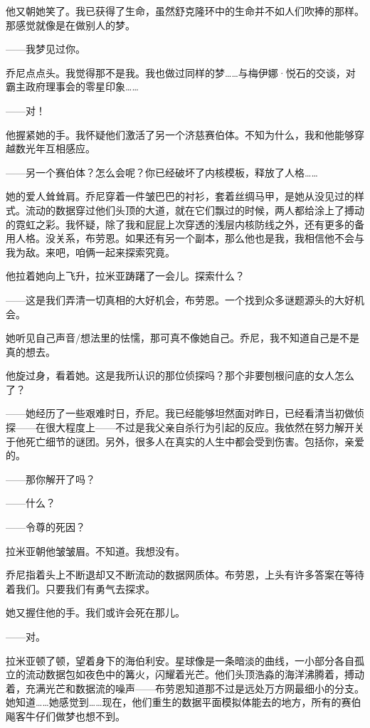 \documentclass[AutoFakeBold=true]{book}
\begin{document}
他又朝她笑了。{\kaishu 我已获得了生命，虽然舒克隆环中的生命并不如人们吹捧的那样。那感觉就像是在做别人的梦。}

{\kaishu ——我梦见过你。}

乔尼点点头。{\kaishu 我觉得那不是我。我也做过同样的梦……与梅伊娜·悦石的交谈，对霸主政府理事会的零星印象……}

{\kaishu ——对！}

他握紧她的手。{\kaishu 我怀疑他们激活了另一个济慈赛伯体。不知为什么，我和他能够穿越数光年互相感应。}

{\kaishu ——另一个赛伯体？怎么会呢？你已经破坏了内核模板，释放了人格……}

她的爱人耸耸肩。乔尼穿着一件皱巴巴的衬衫，套着丝绸马甲，是她从没见过的样式。流动的数据穿过他们头顶的大道，就在它们飘过的时候，两人都给涂上了搏动的霓虹之彩。{\kaishu 我怀疑，除了我和屁屁上次穿透的浅层内核防线之外，还有更多的备用人格。没关系，布劳恩。如果还有另一个副本，那么他也是我，我相信他不会与我为敌。来吧，咱俩一起来探索究竟。}

他拉着她向上飞升，拉米亚踌躇了一会儿。{\kaishu 探索什么？}

{\kaishu ——这是我们弄清一切真相的大好机会，布劳恩。一个找到众多谜题源头的大好机会。}

她听见自己声音/想法里的怯懦，那可真不像她自己。{\kaishu 乔尼，我不知道自己是不是真的想去。}

他旋过身，看着她。{\kaishu 这是我所认识的那位侦探吗？那个非要刨根问底的女人怎么了？}

{\kaishu ——她经历了一些艰难时日，乔尼。我已经能够坦然面对昨日，已经看清当初做侦探——在很大程度上——不过是我父亲自杀行为引起的反应。我依然在努力解开关于他死亡细节的谜团。另外，很多人在真实的人生中都会受到伤害。包括你，亲爱的。}

{\kaishu ——那你解开了吗？}

{\kaishu ——什么？}

{\kaishu ——令尊的死因？}

{\kaishu 拉米亚朝他皱皱眉。不知道。我想没有。}

乔尼指着头上不断退却又不断流动的数据网质体。{\kaishu 布劳恩，上头有许多答案在等待着我们。只要我们有勇气去探求。}

她又握住他的手。{\kaishu 我们或许会死在那儿。}

{\kaishu ——对。}

拉米亚顿了顿，望着身下的海伯利安。星球像是一条暗淡的曲线，一小部分各自孤立的流动数据包如夜色中的篝火，闪耀着光芒。他们头顶浩淼的海洋沸腾着，搏动着，充满光芒和数据流的噪声——布劳恩知道那不过是远处万方网最细小的分支。她知道……{\kaishu 她感觉到}……现在，他们重生的数据平面模拟体能去的地方，所有的赛伯飚客牛仔们做梦也想不到。
\end{document}
